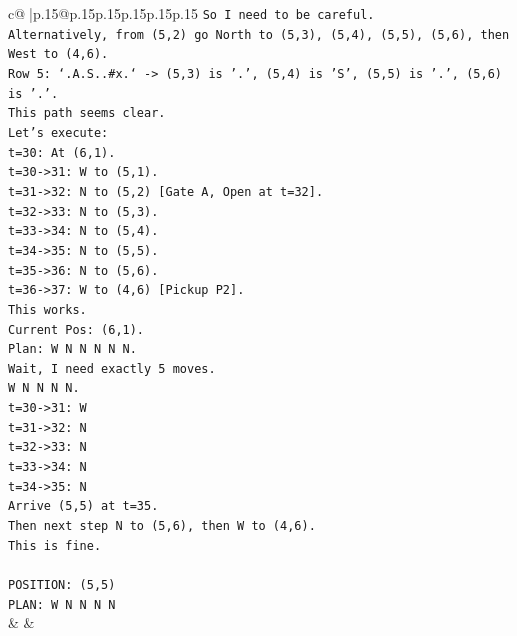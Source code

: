\documentclass{article}
\begin{document}
{\begin{supertabular}{c@{$\;$}|p{.15\linewidth}@{}p{.15\linewidth}p{.15\linewidth}p{.15\linewidth}p{.15\linewidth}p{.15\linewidth}}
{{{\texttt{So I need to be careful.} \\
\texttt{Alternatively, from (5,2) go North to (5,3), (5,4), (5,5), (5,6), then West to (4,6).} \\
\texttt{Row 5: `.A.S..\#x.` {-}> (5,3) is '.', (5,4) is 'S', (5,5) is '.', (5,6) is '.'.} \\
\texttt{This path seems clear.} \\
\texttt{Let's execute:} \\
\texttt{t=30: At (6,1).} \\
\texttt{t=30{-}>31: W to (5,1).} \\
\texttt{t=31{-}>32: N to (5,2) {[}Gate A, Open at t=32{]}.} \\
\texttt{t=32{-}>33: N to (5,3).} \\
\texttt{t=33{-}>34: N to (5,4).} \\
\texttt{t=34{-}>35: N to (5,5).} \\
\texttt{t=35{-}>36: N to (5,6).} \\
\texttt{t=36{-}>37: W to (4,6) {[}Pickup P2{]}.} \\
\texttt{This works.} \\
\texttt{Current Pos: (6,1).} \\
\texttt{Plan: W N N N N N.} \\
\texttt{Wait, I need exactly 5 moves.} \\
\texttt{W N N N N.} \\
\texttt{t=30{-}>31: W} \\
\texttt{t=31{-}>32: N} \\
\texttt{t=32{-}>33: N} \\
\texttt{t=33{-}>34: N} \\
\texttt{t=34{-}>35: N} \\
\texttt{Arrive (5,5) at t=35.} \\
\texttt{Then next step N to (5,6), then W to (4,6).} \\
\texttt{This is fine.} \\
\\ 
\texttt{POSITION: (5,5)} \\
\texttt{PLAN: W N N N N} \\
            }
        }
    }
    & & \\ \\


\end{supertabular}}
\end{document}
